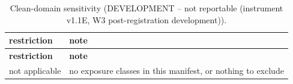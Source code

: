 \begingroup\footnotesize
\begin{longtable}{>{\raggedright\arraybackslash}p{126.4pt}>{\raggedright\arraybackslash}p{304.6pt}}
\caption{Clean-domain sensitivity (DEVELOPMENT -- not reportable (instrument v1.1E, W3 post-registration development)).} \\
\toprule
\textbf{restriction} & \textbf{note} \\
\midrule
\endfirsthead
\toprule
\textbf{restriction} & \textbf{note} \\
\midrule
\endhead
\bottomrule
\endfoot
not applicable & no exposure classes in this manifest, or nothing to exclude \\
\end{longtable}
\endgroup
